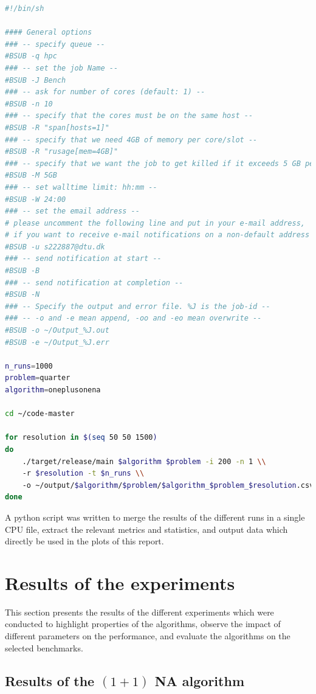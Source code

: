 \begin{lstlisting}[language=bash, caption=Example of a job script, label=lst:job_script]
#!/bin/sh

#### General options
### -- specify queue --
#BSUB -q hpc
### -- set the job Name --
#BSUB -J Bench
### -- ask for number of cores (default: 1) --
#BSUB -n 10
### -- specify that the cores must be on the same host --
#BSUB -R "span[hosts=1]"
### -- specify that we need 4GB of memory per core/slot --
#BSUB -R "rusage[mem=4GB]"
### -- specify that we want the job to get killed if it exceeds 5 GB per core/slot --
#BSUB -M 5GB
### -- set walltime limit: hh:mm --
#BSUB -W 24:00
### -- set the email address --
# please uncomment the following line and put in your e-mail address,
# if you want to receive e-mail notifications on a non-default address
#BSUB -u s222887@dtu.dk
### -- send notification at start --
#BSUB -B
### -- send notification at completion --
#BSUB -N
### -- Specify the output and error file. %J is the job-id --
### -- -o and -e mean append, -oo and -eo mean overwrite --
#BSUB -o ~/Output_%J.out
#BSUB -e ~/Output_%J.err

n_runs=1000
problem=quarter
algorithm=oneplusonena

cd ~/code-master

for resolution in $(seq 50 50 1500)
do
    ./target/release/main $algorithm $problem -i 200 -n 1 \\
    -r $resolution -t $n_runs \\
    -o ~/output/$algorithm/$problem/$algorithm_$problem_$resolution.csv
done
\end{lstlisting}

A python script was written to merge the results of the different runs in a single CPU file, extract the relevant metrics and statistics, and output data which directly be used
in the  plots of this report.

\section{Results of the experiments}
\label{sec:results}

This section presents the results of the different experiments which were conducted to highlight properties of the algorithms, observe the impact of different parameters on the performance,
and evaluate the algorithms on the selected benchmarks.

\subsection{Results of the $(1 + 1)$ NA algorithm}

